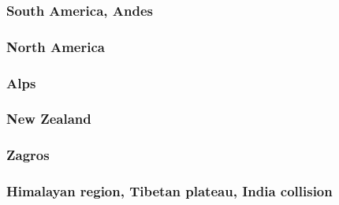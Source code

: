 \subsubsection*{South America, Andes} 

\cite{wdbo94b}
\cite{basv06}
\cite{robn16}

\subsubsection*{North America} 

\cite{bugm97}

\subsubsection*{Alps} 

\cite{pfsb02}
\cite{buge05}
\cite{luws13}
\cite{scdu15}

\subsubsection*{New Zealand} 

\cite{koon90}
\cite{brbe95}
\cite{bekh96}
\cite{babr99}
\cite{libi06}
\cite{gedh02}\cite{pybf02}
\cite{gehd03}\cite{konc03}\cite{upke03}
\cite{pyeg10}
\cite{grel12}

\subsubsection*{Zagros}

\cite{vech06}
\cite{hamo10}
\cite{yakm11}
\cite{nipc13}
\cite{frba14}
\cite{ghbu14}
\cite{rugb17}

\subsubsection*{Himalayan region, Tibetan plateau, India collision} 

